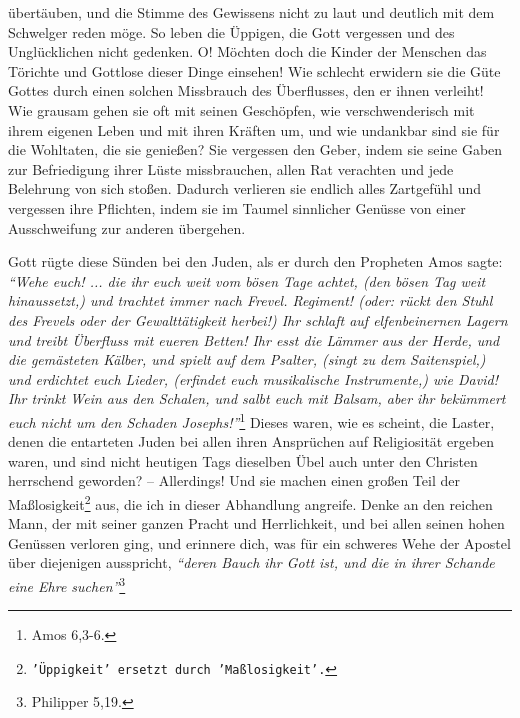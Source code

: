 übertäuben, und die
Stimme des Gewissens nicht zu laut und deutlich mit
dem Schwelger
reden möge. So
leben die Üppigen, die Gott vergessen und des Unglücklichen nicht gedenken. O!
Möchten doch die Kinder der Menschen das Törichte und Gottlose dieser Dinge
einsehen! Wie schlecht erwidern sie die Güte Gottes durch einen solchen
Missbrauch des Überflusses, den er ihnen verleiht! Wie grausam gehen sie oft
mit seinen Geschöpfen, wie verschwenderisch mit ihrem
eigenen Leben und mit
ihren Kräften um, und wie undankbar sind sie für die Wohltaten,
die sie
genießen? Sie vergessen den Geber, indem sie seine Gaben zur Befriedigung ihrer
Lüste missbrauchen, allen Rat verachten und jede Belehrung von sich stoßen.
Dadurch verlieren sie endlich alles Zartgefühl und vergessen ihre
Pflichten,
indem sie im Taumel sinnlicher Genüsse von einer Ausschweifung zur anderen
übergehen.

\medskip

Gott rügte diese Sünden bei den Juden, als er durch den
Propheten Amos sagte:
\textit{"`Wehe euch! ... die ihr euch weit vom bösen Tage achtet, (den bösen Tag
weit
hinaussetzt,) und trachtet immer nach Frevel. Regiment! (oder: rückt den Stuhl
des Frevels oder der Gewalttätigkeit herbei!) Ihr schlaft auf elfenbeinernen
Lagern und treibt Überfluss mit eueren Betten! Ihr esst die Lämmer aus der
Herde, und die gemästeten Kälber, und spielt auf dem Psalter, (singt zu dem
Saitenspiel,) und erdichtet euch Lieder, (erfindet euch musikalische
Instrumente,) wie David! Ihr trinkt Wein aus den Schalen, und salbt euch mit
Balsam, aber ihr bekümmert euch nicht um den Schaden Josephs!"'}\footnote{Amos
6,3-6.}
Dieses waren, wie es scheint, die Laster, denen die entarteten
Juden bei allen ihren Ansprüchen auf
Religiosität ergeben waren,
und sind nicht
heutigen Tags dieselben Übel auch unter den Christen
herrschend geworden? --
Allerdings! Und sie machen einen großen Teil der
Maßlosigkeit\footnote{\texttt{'Üppigkeit' ersetzt
durch 'Maßlosigkeit'.}} aus, die ich in
dieser Abhandlung angreife. Denke an den reichen Mann, der mit seiner ganzen
Pracht und Herrlichkeit, und bei allen seinen hohen Genüssen verloren ging, und
erinnere dich, was für ein schweres Wehe der Apostel über diejenigen ausspricht,
\textit{"`deren Bauch ihr Gott ist, und die in ihrer Schande eine Ehre
suchen"'}\footnote{Philipper 5,19.}

